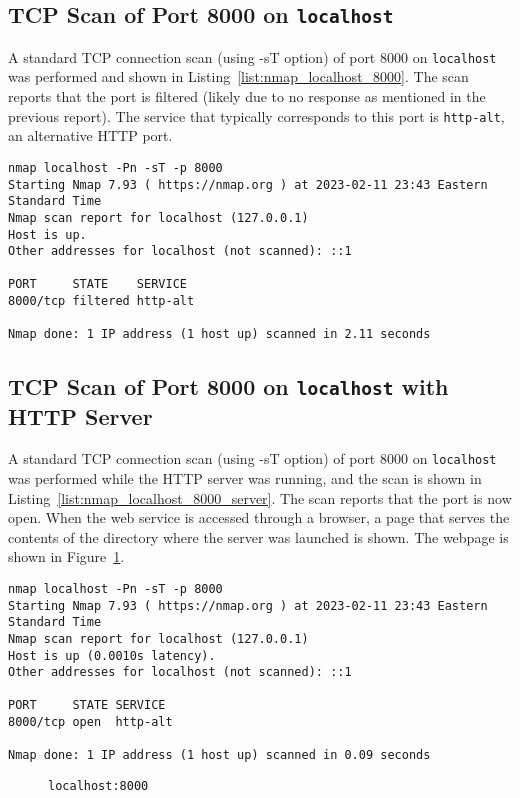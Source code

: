 \subsection*{TCP Scan of Port 8000 on \texttt{localhost}}
A standard TCP connection scan (using -sT option) of port 8000 on \texttt{localhost} was performed and shown in Listing~\ref{list:nmap_localhost_8000}. The scan reports that the port is filtered (likely due to no response as mentioned in the previous report). The service that typically corresponds to this port is \texttt{http-alt}, an alternative HTTP port.

\begin{lstlisting}[caption=Nmap Standard TCP Connection Scan of Port 8000 on \texttt{localhost},label=list:nmap_localhost_8000]
nmap localhost -Pn -sT -p 8000
Starting Nmap 7.93 ( https://nmap.org ) at 2023-02-11 23:43 Eastern Standard Time
Nmap scan report for localhost (127.0.0.1)
Host is up.
Other addresses for localhost (not scanned): ::1

PORT     STATE    SERVICE
8000/tcp filtered http-alt

Nmap done: 1 IP address (1 host up) scanned in 2.11 seconds
\end{lstlisting}

\subsection*{TCP Scan of Port 8000 on \texttt{localhost} with HTTP Server}
A standard TCP connection scan (using -sT option) of port 8000 on \texttt{localhost} was performed while the HTTP server was running, and the scan is shown in Listing~\ref{list:nmap_localhost_8000_server}. The scan reports that the port is now open. When the web service is accessed through a browser, a page that serves the contents of the directory where the server was launched is shown. The webpage is shown in Figure~\ref{fig:server}.

\begin{lstlisting}[caption=Nmap Standard TCP Connection Scan of Port 8000 on \texttt{localhost} with HTTP Server,label=list:nmap_localhost_8000_server]
nmap localhost -Pn -sT -p 8000
Starting Nmap 7.93 ( https://nmap.org ) at 2023-02-11 23:43 Eastern Standard Time
Nmap scan report for localhost (127.0.0.1)
Host is up (0.0010s latency).
Other addresses for localhost (not scanned): ::1

PORT     STATE SERVICE
8000/tcp open  http-alt

Nmap done: 1 IP address (1 host up) scanned in 0.09 seconds
\end{lstlisting}

\begin{figure}[htp]
\centering
\caption[server]{\texttt{localhost:8000}}\label{fig:server}
\end{figure}